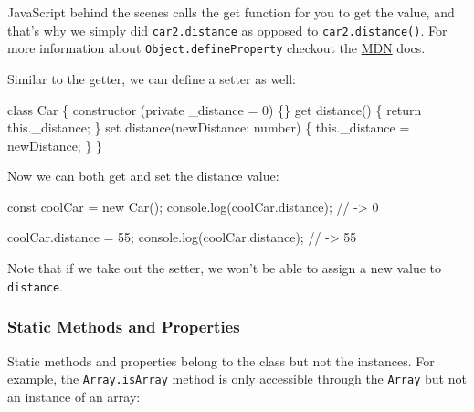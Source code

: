 \documentclass[12pt,]{article}
\newenvironment{Shaded}{}{}
\newcommand{\KeywordTok}[1]{\textcolor[rgb]{0.00,0.00,1.00}{{#1}}}
\newcommand{\DataTypeTok}[1]{{#1}}
\newcommand{\DecValTok}[1]{{#1}}
\newcommand{\CommentTok}[1]{\textcolor[rgb]{0.00,0.50,0.00}{{#1}}}
\newcommand{\FunctionTok}[1]{{#1}}
\newcommand{\NormalTok}[1]{{#1}}
\begin{document}
JavaScript behind the scenes calls the get function for you to get the
value, and that's why we simply did \texttt{car2.distance} as opposed to
\texttt{car2.distance()}. For more information about
\texttt{Object.defineProperty} checkout the
\href{https://developer.mozilla.org/en-US/docs/Web/JavaScript/Reference/Global_Objects/Object/defineProperty}{MDN}
docs.

Similar to the getter, we can define a setter as well:

\begin{Shaded}
\begin{Highlighting}[numbers=left,,]
\KeywordTok{class} \NormalTok{Car \{}
  \FunctionTok{constructor} \NormalTok{(}\KeywordTok{private} \NormalTok{_distance = }\DecValTok{0}\NormalTok{) \{\}}
  \NormalTok{get }\FunctionTok{distance}\NormalTok{() \{ }\KeywordTok{return} \KeywordTok{this}\NormalTok{.}\FunctionTok{_distance}\NormalTok{; \}}
  \NormalTok{set }\FunctionTok{distance}\NormalTok{(newDistance: number) \{ }\KeywordTok{this}\NormalTok{.}\FunctionTok{_distance} \NormalTok{= newDistance; \}}
\NormalTok{\}}
\end{Highlighting}
\end{Shaded}

Now we can both get and set the distance value:

\begin{Shaded}
\begin{Highlighting}[numbers=left,,]
\DataTypeTok{const} \NormalTok{coolCar = }\KeywordTok{new} \FunctionTok{Car}\NormalTok{();}
\NormalTok{console.}\FunctionTok{log}\NormalTok{(coolCar.}\FunctionTok{distance}\NormalTok{); }\CommentTok{// -> 0}

\NormalTok{coolCar.}\FunctionTok{distance} \NormalTok{= }\DecValTok{55}\NormalTok{;}
\NormalTok{console.}\FunctionTok{log}\NormalTok{(coolCar.}\FunctionTok{distance}\NormalTok{); }\CommentTok{// -> 55}
\end{Highlighting}
\end{Shaded}

Note that if we take out the setter, we won't be able to assign a new
value to \texttt{distance}.

\subsubsection{Static Methods and
Properties}\label{static-methods-and-properties}

Static methods and properties belong to the class but not the instances.
For example, the \texttt{Array.isArray} method is only accessible
through the \texttt{Array} but not an instance of an array:
\end{document}
